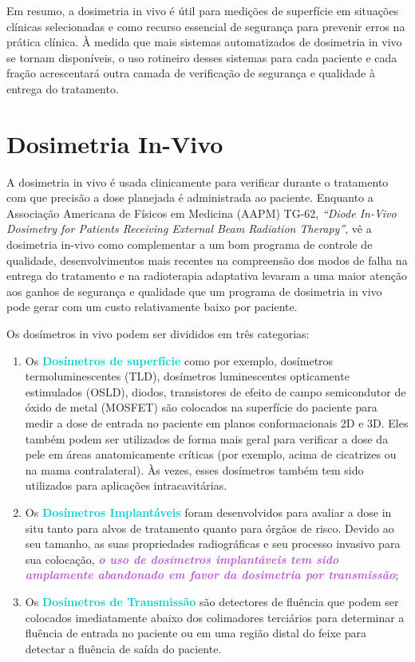 \documentclass[11pt,a4paper]{article}
\newcounter{exemplo}
\begin{document}
	Em resumo, a dosimetria in vivo é útil para medições de superfície em situações clínicas selecionadas e como recurso essencial de segurança para prevenir erros na prática clínica. À medida que mais sistemas automatizados de dosimetria in vivo se tornam disponíveis, o uso rotineiro desses sistemas para cada paciente e cada fração acrescentará outra camada de verificação de segurança e qualidade à entrega do tratamento.



\section{Dosimetria In-Vivo}

	A dosimetria in vivo é usada clinicamente para verificar durante o tratamento com que precisão a dose planejada é administrada ao paciente. Enquanto a Associação Americana de Físicos em Medicina (AAPM) TG-62, \textit{``Diode In-Vivo Dosimetry for Patients Receiving External Beam Radiation Therapy''}, vê a dosimetria in-vivo como complementar a um bom programa de controle de qualidade, desenvolvimentos mais recentes na compreensão dos modos de falha na entrega do tratamento e na radioterapia adaptativa levaram a uma maior atenção aos ganhos de segurança e qualidade que um programa de dosimetria in vivo pode gerar com um custo relativamente baixo por paciente.

	Os dosímetros in vivo podem ser divididos em três categorias:

	\begin{enumerate}
		\item Os \textcolor{DarkTurquoise}{\textbf{Dosímetros de superfície}} como por exemplo, dosímetros termoluminescentes (TLD), dosímetros luminescentes opticamente estimulados (OSLD), diodos, transistores de efeito de campo semicondutor de óxido de metal (MOSFET) são colocados na superfície do paciente para medir a dose de entrada no paciente em planos conformacionais 2D e 3D. Eles também podem ser utilizados de forma mais geral para verificar a dose da pele em áreas anatomicamente críticas (por exemplo, acima de cicatrizes ou na mama contralateral). Às vezes, esses dosímetros também tem sido utilizados para aplicações intracavitárias.
		
		\item Os \textcolor{DarkTurquoise}{\textbf{Dosímetros Implantáveis}} foram desenvolvidos para avaliar a dose in situ tanto para alvos de tratamento quanto para órgãos de risco. Devido ao seu tamanho, as suas propriedades radiográficas e seu processo invasivo para sua colocação, \textcolor{MediumOrchid}{\textbf{\textit{o uso de dosímetros implantáveis tem sido amplamente abandonado em favor da dosimetria por transmissão}}};
		
		\item Os \textcolor{DarkTurquoise}{\textbf{Dosímetros de Transmissão}} são detectores de fluência que podem ser colocados imediatamente abaixo dos colimadores terciários para determinar a fluência de entrada no paciente ou em uma região distal do feixe para detectar a fluência de saída do paciente. 
	\end{enumerate}
\end{document}
